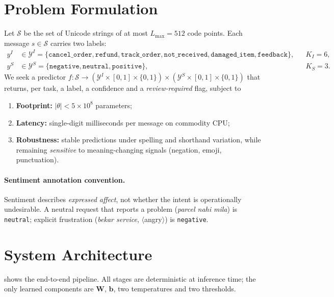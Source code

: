 \documentclass[11pt,a4paper]{article}
\theoremstyle{remark}
\newcommand{\lbl}[1]{\texttt{#1}}                      %
\newcommand{\hi}[1]{\textit{#1}}                       %
\newcommand{\emo}[1]{\textsf{\small$\langle$#1$\rangle$}} %
\newcommand{\W}{\bm{W}}
\newcommand{\bb}{\bm{b}}
\begin{document}
\section{Problem Formulation}
\label{sec:problem}

Let $\mathcal{S}$ be the set of Unicode strings of at most $L_{\max}=512$ code
points. Each message $s\in\mathcal{S}$ carries two labels:
\begin{align*}
  y^{I} &\in \mathcal{Y}^{I} = \{\lbl{cancel\_order},\lbl{refund},\lbl{track\_order},\lbl{not\_received},\lbl{damaged\_item},\lbl{feedback}\}, && K_I=6,\\
  y^{S} &\in \mathcal{Y}^{S} = \{\lbl{negative},\lbl{neutral},\lbl{positive}\}, && K_S=3.
\end{align*}
We seek a predictor $f:\mathcal{S}\to(\mathcal{Y}^{I}\times[0,1]\times\{0,1\})
\times(\mathcal{Y}^{S}\times[0,1]\times\{0,1\})$ that returns, per task, a label,
a confidence and a \emph{review-required} flag, subject to
\begin{enumerate}
  \item \textbf{Footprint:} $|\theta| < 5\times10^{8}$ parameters;
  \item \textbf{Latency:} single-digit milliseconds per message on commodity CPU;
  \item \textbf{Robustness:} stable predictions under spelling and shorthand
        variation, while remaining \emph{sensitive} to meaning-changing
        signals (negation, emoji, punctuation).
\end{enumerate}

\paragraph{Sentiment annotation convention.} Sentiment describes
\emph{expressed affect}, not whether the intent is operationally undesirable.
A neutral request that reports a problem (\hi{parcel nahi mila}) is
\lbl{neutral}; explicit frustration (\hi{bekar service}, \emo{angry}) is
\lbl{negative}.

\section{System Architecture}
\label{sec:arch}

 shows the end-to-end pipeline. All stages are deterministic at
inference time; the only learned components are $\W$, $\bb$, two temperatures
and two thresholds.
\end{document}
